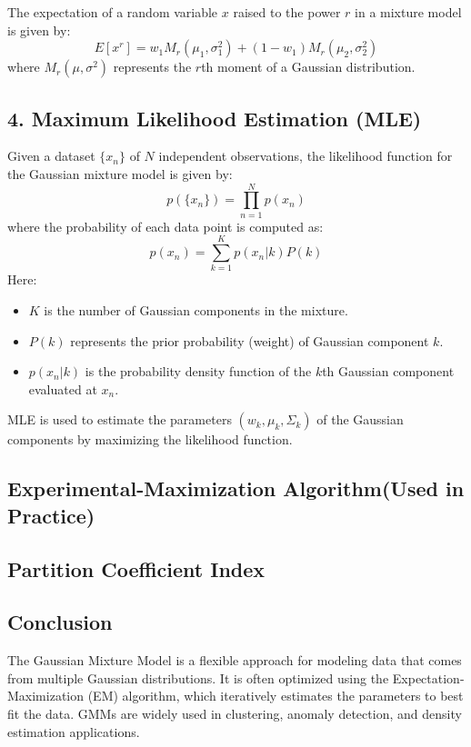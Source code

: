 \documentclass{article}
\begin{document}
The expectation of a random variable \(x\) raised to the power \(r\) in a mixture model is given by:
\[
E[x^r] = w_1M_r(\mu_1,\sigma_1^2) + (1 - w_1)M_r(\mu_2,\sigma_2^2)
\]
where \(M_r(\mu, \sigma^2)\) represents the \(r\)th moment of a Gaussian distribution.

\subsection*{4. Maximum Likelihood Estimation (MLE)}
Given a dataset \( \{x_n\} \) of \(N\) independent observations, the likelihood function for the Gaussian mixture model is given by:
\[
p(\{x_n\}) = \prod_{n=1}^{N} p(x_n)
\]
where the probability of each data point is computed as:
\[
p(x_n) = \sum_{k=1}^{K} p(x_n|k) P(k)
\]
Here:
\begin{itemize}
    \item \(K\) is the number of Gaussian components in the mixture.
    \item \(P(k)\) represents the prior probability (weight) of Gaussian component \(k\).
    \item \(p(x_n|k)\) is the probability density function of the \(k\)th Gaussian component evaluated at \(x_n\).
\end{itemize}
MLE is used to estimate the parameters \((w_k, \mu_k, \Sigma_k)\) of the Gaussian components by maximizing the likelihood function.

\subsection*{Experimental-Maximization Algorithm(Used in Practice)}
\subsection*{Partition Coefficient Index}
\subsection*{Conclusion}
The Gaussian Mixture Model is a flexible approach for modeling data that comes from multiple Gaussian distributions. It is often optimized using the Expectation-Maximization (EM) algorithm, which iteratively estimates the parameters to best fit the data. GMMs are widely used in clustering, anomaly detection, and density estimation applications.
\end{document}
